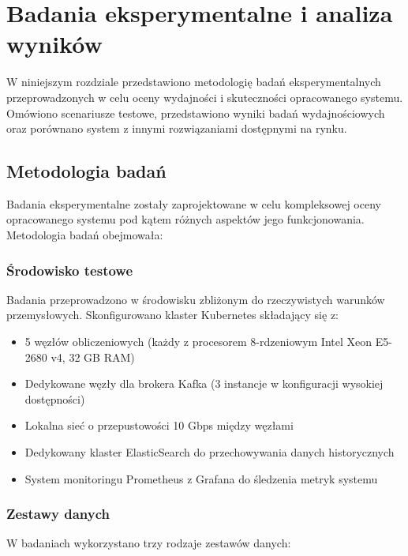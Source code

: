 \section{Badania eksperymentalne i analiza wyników}
\label{sec:badania_eksperymentalne}

W niniejszym rozdziale przedstawiono metodologię badań eksperymentalnych przeprowadzonych w celu oceny wydajności i skuteczności opracowanego systemu. Omówiono scenariusze testowe, przedstawiono wyniki badań wydajnościowych oraz porównano system z innymi rozwiązaniami dostępnymi na rynku.

\subsection{Metodologia badań}
\label{subsec:metodologia_badan}

Badania eksperymentalne zostały zaprojektowane w celu kompleksowej oceny opracowanego systemu pod kątem różnych aspektów jego funkcjonowania. Metodologia badań obejmowała:

\subsubsection{Środowisko testowe}
\label{subsubsec:srodowisko_testowe}

Badania przeprowadzono w środowisku zbliżonym do rzeczywistych warunków przemysłowych. Skonfigurowano klaster Kubernetes składający się z:

\begin{itemize}
    \item 5 węzłów obliczeniowych (każdy z procesorem 8-rdzeniowym Intel Xeon E5-2680 v4, 32 GB RAM)
    \item Dedykowane węzły dla brokera Kafka (3 instancje w konfiguracji wysokiej dostępności)
    \item Lokalna sieć o przepustowości 10 Gbps między węzłami
    \item Dedykowany klaster ElasticSearch do przechowywania danych historycznych
    \item System monitoringu Prometheus z Grafana do śledzenia metryk systemu
\end{itemize}

\subsubsection{Zestawy danych}
\label{subsubsec:zestawy_danych}

W badaniach wykorzystano trzy rodzaje zestawów danych:

